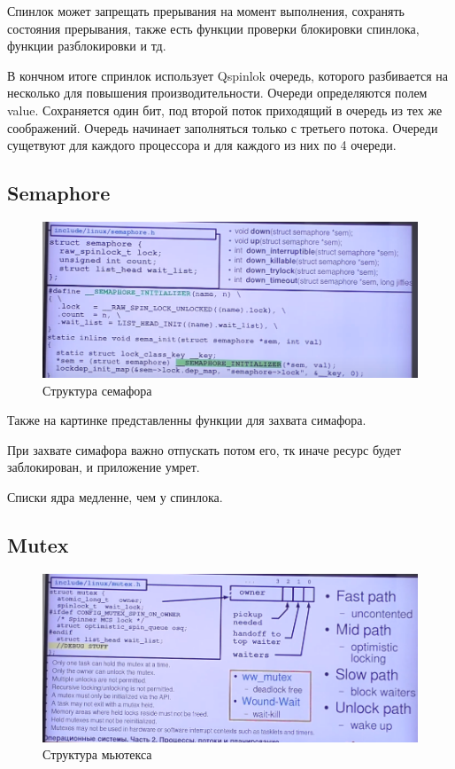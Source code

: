 \documentclass[bachelor, och, book]{SCWorks}
\theoremstyle{remark}
\begin{document}
    Спинлок может запрещать прерывания на момент выполнения, сохранять состояния прерывания, также есть функции проверки блокировки спинлока, функции разблокировки и тд.
 
    В кончном итоге спринлок использует Qspinlok очередь, которого разбивается на несколько для повышения производительности. Очереди определяются полем value. Сохраняется один бит, под второй поток приходящий в очередь из тех же соображений. Очередь начинает заполняться только с третьего потока. Очереди сущетвуют для каждого процессора и для каждого из них по 4 очереди.

    \subsection{Semaphore}

    \begin{figure}[H]
        \begin{center}
            \includegraphics[scale=0.50]{res/struckture-semaphore.png}
            \caption{Структура семафора}
        \end{center}
    \end{figure}

    Также на картинке представленны функции для захвата симафора. 

    При захвате симафора важно отпускать потом его, тк иначе ресурс будет заблокирован, и приложение умрет.

    Списки ядра медленне, чем у спинлока.

    \subsection{Mutex}

    \begin{figure}[H]
        \begin{center}
            \includegraphics[scale=0.50]{res/Mutex-structure.png}
            \caption{Структура мьютекса}
        \end{center}
    \end{figure}
\end{document}
